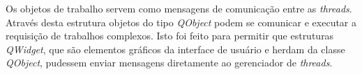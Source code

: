 Os objetos de trabalho servem como mensagens de comunicação entre as \textit{threads}. Através desta estrutura objetos do tipo \textit{QObject} podem se comunicar e executar a requisição de trabalhos complexos. Isto foi feito para permitir que estruturas \textit{QWidget}, que são elementos gráficos da interface de usuário e herdam da classe \textit{QObject}, pudessem enviar mensagens diretamente ao gerenciador de \textit{threads}. 